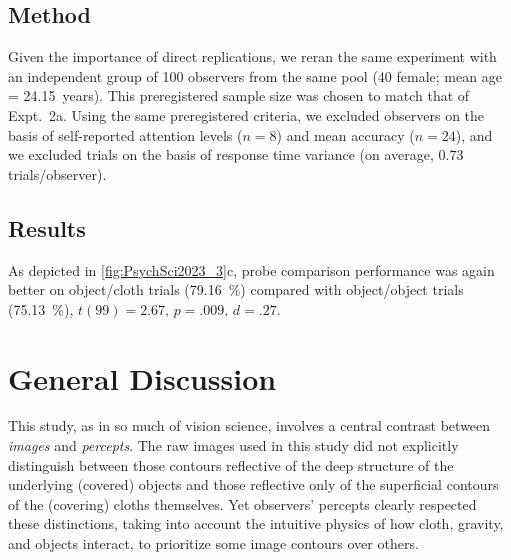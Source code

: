 \subsection{Method}

Given the importance of direct replications, we reran the same experiment with an independent group of 100 observers from the same pool (40 female; mean age = 24.15~years). This preregistered sample size was chosen to match that of Expt.~2a. Using the same preregistered criteria, we excluded observers on the basis of self-reported attention levels ($n = 8$) and mean accuracy ($n = 24$), and we excluded trials on the basis of response time variance (on average, 0.73 trials/observer).

\subsection{Results}

As depicted in \cref{fig:PsychSci2023_3}c, probe comparison performance was again better on object/cloth trials (\qty{79.16}{\percent}) compared with object/object trials (\qty{75.13}{\percent}), $t(99) = 2.67,\,p = .009,\,d = .27$.

\section{General Discussion}

This study, as in so much of vision science, involves a central contrast between \textit{images} and \textit{percepts}. The raw images used in this study did not explicitly distinguish between those contours reflective of the deep structure of the underlying (covered) objects and those reflective only of the superficial contours of the (covering) cloths themselves. Yet observers’ percepts clearly respected these distinctions, taking into account the intuitive physics of how cloth, gravity, and objects interact, to prioritize some image contours over others.

